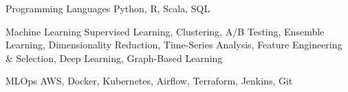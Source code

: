 

\begin{cvskills}

  \cvskill
    {Programming Languages}
    {Python, R, Scala, SQL}

  \cvskill
    {Machine Learning}
    {
      Supervised Learning, Clustering, A/B Testing, 
      Ensemble Learning, %
      Dimensionality Reduction, %
      Time-Series Analysis, %
      Feature Engineering \& Selection, %
      Deep Learning, %
      Graph-Based Learning
    }

  \cvskill
    {MLOps}
    {AWS, Docker, Kubernetes, Airflow, Terraform, Jenkins, Git}


  

\end{cvskills}
